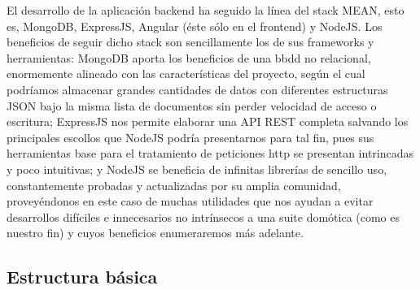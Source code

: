 El desarrollo de la aplicación backend ha seguido la línea del stack MEAN, esto es, MongoDB, ExpressJS, Angular (éste sólo en el frontend) y NodeJS. Los beneficios de seguir dicho stack son sencillamente los de sus frameworks y herramientas: MongoDB aporta los beneficios de una \gls{bbdd} no relacional, enormemente alineado con las características del proyecto, según el cual podríamos almacenar grandes cantidades de datos con diferentes estructuras JSON bajo la misma lista de documentos sin perder velocidad de acceso o escritura; ExpressJS nos permite elaborar una API REST completa salvando los principales escollos que NodeJS podría presentarnos para tal fin, pues sus herramientas base para el tratamiento de peticiones http se presentan intrincadas y poco intuitivas; y NodeJS se beneficia de infinitas librerías de sencillo uso, constantemente probadas y actualizadas por su amplia comunidad, proveyéndonos en este caso de muchas utilidades que nos ayudan a evitar desarrollos difíciles e innecesarios no intrínsecos a una suite domótica (como es nuestro fin) y cuyos beneficios enumeraremos más adelante.

\subsection{Estructura básica}
\label{ch:Capitulo4.7.2}

